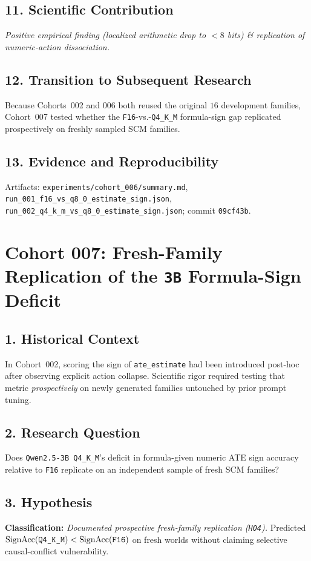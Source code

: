 \subsection*{11. Scientific Contribution}
\emph{Positive empirical finding (localized arithmetic drop to $<8$ bits) \& replication of numeric-action dissociation.}

\subsection*{12. Transition to Subsequent Research}
Because Cohorts~002 and 006 both reused the original $16$ development families, Cohort~007 tested whether the \texttt{F16}-vs.-\texttt{Q4\_K\_M} formula-sign gap replicated prospectively on freshly sampled SCM families.

\subsection*{13. Evidence and Reproducibility}
Artifacts: \texttt{experiments/cohort\_006/summary.md}, \texttt{run\_001\_f16\_vs\_q8\_0\_estimate\_sign.json}, \texttt{run\_002\_q4\_k\_m\_vs\_q8\_0\_estimate\_sign.json}; commit \texttt{09cf43b}.

\section{Cohort 007: Fresh-Family Replication of the \texttt{3B} Formula-Sign Deficit}

\subsection*{1. Historical Context}
In Cohort~002, scoring the sign of \texttt{ate\_estimate} had been introduced post-hoc after observing explicit action collapse. Scientific rigor required testing that metric \emph{prospectively} on newly generated families untouched by prior prompt tuning.

\subsection*{2. Research Question}
Does \texttt{Qwen2.5-3B Q4\_K\_M}'s deficit in formula-given numeric ATE sign accuracy relative to \texttt{F16} replicate on an independent sample of fresh SCM families?

\subsection*{3. Hypothesis}
\textbf{Classification:} \emph{Documented prospective fresh-family replication (\texttt{H04}).} Predicted $\mathrm{SignAcc}(\text{\texttt{Q4\_K\_M}}) < \mathrm{SignAcc}(\text{\texttt{F16}})$ on fresh worlds without claiming selective causal-conflict vulnerability.

